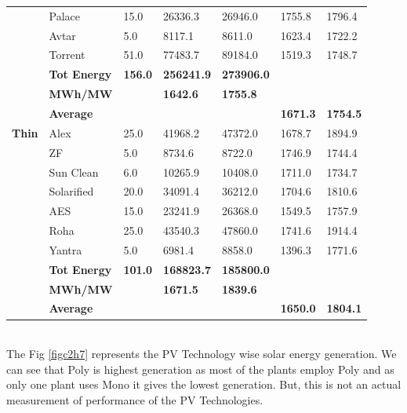 \begin{table}[H]
\begin{tabular}{|c|l|l|l|l|l|l|}
\cline{2-7}       & Palace & 15.0 & 26336.3 & 26946.0 & 1755.8 & 1796.4 \bigstrut\\
\cline{2-7}       & Avtar  & 5.0 & 8117.1 & 8611.0 & 1623.4 & 1722.2 \bigstrut\\
\cline{2-7}       & Torrent  & 51.0 & 77483.7 & 89184.0 & 1519.3 & 1748.7 \bigstrut\\
\cline{2-7}       & \textbf{Tot Energy} & \textbf{156.0} & \textbf{256241.9} & \textbf{273906.0} &    &  \bigstrut\\
\cline{2-7}       & \textbf{MWh/MW} &    & \textbf{1642.6} & \textbf{1755.8} &    &  \bigstrut\\
\cline{2-7}       & \textbf{Average} &    &    &    & \textbf{1671.3} & \textbf{1754.5} \bigstrut\\
    \hline
    \textbf{Thin} & Alex  & 25.0 & 41968.2 & 47372.0 & 1678.7 & 1894.9 \bigstrut\\
\cline{2-7}       & ZF  & 5.0 & 8734.6 & 8722.0 & 1746.9 & 1744.4 \bigstrut\\
\cline{2-7}       & Sun Clean & 6.0 & 10265.9 & 10408.0 & 1711.0 & 1734.7 \bigstrut\\
\cline{2-7}       & Solarified & 20.0 & 34091.4 & 36212.0 & 1704.6 & 1810.6 \bigstrut\\
\cline{2-7}       & AES  & 15.0 & 23241.9 & 26368.0 & 1549.5 & 1757.9 \bigstrut\\
\cline{2-7}       & Roha  & 25.0 & 43540.3 & 47860.0 & 1741.6 & 1914.4 \bigstrut\\
\cline{2-7}       & Yantra & 5.0 & 6981.4 & 8858.0 & 1396.3 & 1771.6 \bigstrut\\
\cline{2-7}       & \textbf{Tot Energy} & \textbf{101.0} & \textbf{168823.7} & \textbf{185800.0} &    &  \bigstrut\\
\cline{2-7}       & \textbf{MWh/MW} &    & \textbf{1671.5} & \textbf{1839.6} &    &  \bigstrut\\
\cline{2-7}       & \textbf{Average} &    &    &    & \textbf{1650.0} & \textbf{1804.1} \bigstrut\\
    \hline
    \end{tabular}%

    \label{tabc2h3}%

\end{table}
\\
The Fig \ref{figc2h7} represents the PV Technology wise solar energy generation. We can see that Poly is highest generation as most of the plants employ Poly and as only one plant uses Mono it gives the lowest generation. But, this is not an actual measurement of performance of the PV Technologies.
\\

